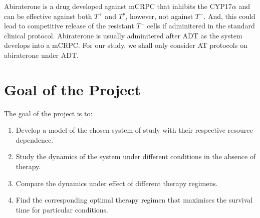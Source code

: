 Abiraterone is a drug developed against mCRPC that inhibits the CYP17$\alpha$ and can be effective against both $T^+$ and $T^p$, however, not against $T^-$. And, this could lead to competitive release of the resistant $T^-$ cells if adminitered in the standard clinical protocol. Abiraterone is usually adminitered after ADT as the system develops into a mCRPC. For our study, we shall only consider AT protocols on abiraterone under ADT.

\section{Goal of the Project}
The goal of the project is to:
\begin{enumerate}
  \item Develop a model of the chosen system of study with their respective resource dependence.
  \item Study the dynamics of the system under different conditions in the absence of therapy.
  \item Compare the dynamics under effect of different therapy regimens.
  \item Find the corresponding optimal therapy regimen that maximises the survival time for particular conditions.
\end{enumerate}
